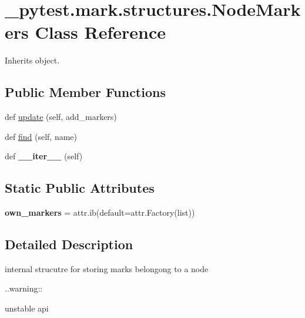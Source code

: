 \hypertarget{class__pytest_1_1mark_1_1structures_1_1_node_markers}{}\section{\+\_\+pytest.\+mark.\+structures.\+Node\+Markers Class Reference}
\label{class__pytest_1_1mark_1_1structures_1_1_node_markers}


Inherits object.

\subsection*{Public Member Functions}
\begin{DoxyCompactItemize}
\item 
def \hyperlink{class__pytest_1_1mark_1_1structures_1_1_node_markers_a38241a5127ec43742fadc9d1f47da52f}{update} (self, add\+\_\+markers)
\item 
def \hyperlink{class__pytest_1_1mark_1_1structures_1_1_node_markers_ade453fc486862740e3f819ad9482d74f}{find} (self, name)
\item 
\mbox{\label{class__pytest_1_1mark_1_1structures_1_1_node_markers_af5c9b401a699faf7a82bfa23d27cee47}} 
def {\bfseries \+\_\+\+\_\+iter\+\_\+\+\_\+} (self)
\end{DoxyCompactItemize}
\subsection*{Static Public Attributes}
\begin{DoxyCompactItemize}
\item 
\mbox{\label{class__pytest_1_1mark_1_1structures_1_1_node_markers_a77180e8316fadac63bbe6755e4654332}} 
{\bfseries own\+\_\+markers} = attr.\+ib(default=attr.\+Factory(list))
\end{DoxyCompactItemize}


\subsection{Detailed Description}
\begin{DoxyVerb}internal strucutre for storing marks belongong to a node

..warning::

    unstable api\end{DoxyVerb}
 

